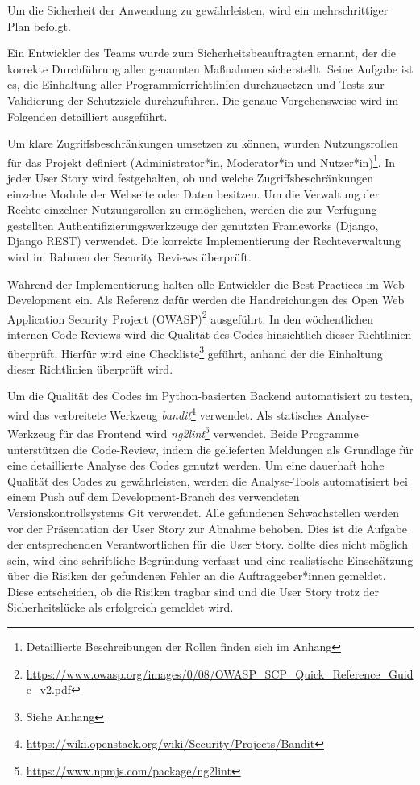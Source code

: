 \documentclass[accentcolor=tud0b,12pt,paper=a4]{tudreport}
\begin{document}
Um die Sicherheit der Anwendung zu gewährleisten, wird ein mehrschrittiger Plan befolgt.

Ein Entwickler des Teams wurde zum Sicherheitsbeauftragten ernannt, der die korrekte Durchführung aller genannten Maßnahmen sicherstellt. Seine Aufgabe ist es, die Einhaltung aller Programmierrichtlinien durchzusetzen und Tests zur Validierung der Schutzziele durchzuführen. Die genaue Vorgehensweise wird im Folgenden detailliert ausgeführt.

Um klare Zugriffsbeschränkungen umsetzen zu können, wurden Nutzungsrollen für das Projekt definiert (Administrator*in, Moderator*in und Nutzer*in)\footnote{Detaillierte Beschreibungen der Rollen finden sich im Anhang}. In jeder User Story wird festgehalten, ob und welche Zugriffsbeschränkungen einzelne Module der Webseite oder Daten besitzen. Um die Verwaltung der Rechte einzelner Nutzungsrollen zu ermöglichen, werden die zur Verfügung gestellten Authentifizierungswerkzeuge der genutzten Frameworks (Django, Django REST) verwendet. Die korrekte Implementierung der Rechteverwaltung wird im Rahmen der Security Reviews überprüft.

Während der Implementierung halten alle Entwickler die Best Practices im Web Development ein. Als Referenz dafür werden die Handreichungen des Open Web Application Security Project (OWASP)\footnote{\href{https://www.owasp.org/images/0/08/OWASP_SCP_Quick_Reference_Guide_v2.pdf}{https://www.owasp.org/images/0/08/OWASP\_SCP\_Quick\_Reference\_Guide\_v2.pdf}} ausgeführt. In den wöchentlichen internen Code-Reviews wird die Qualität des Codes hinsichtlich dieser Richtlinien überprüft. Hierfür wird eine Checkliste\footnote{Siehe Anhang} geführt, anhand der die Einhaltung dieser Richtlinien überprüft wird.

Um die Qualität des Codes im Python-basierten Backend automatisiert zu testen, wird das verbreitete Werkzeug \emph{bandit}\footnote{\href{https://wiki.openstack.org/wiki/Security/Projects/Bandit}{https://wiki.openstack.org/wiki/Security/Projects/Bandit}} verwendet. Als statisches Analyse-Werkzeug für das Frontend wird \emph{ng2lint}\footnote{\href{https://www.npmjs.com/package/ng2lint}{https://www.npmjs.com/package/ng2lint}} verwendet. Beide Programme unterstützen die Code-Review, indem die gelieferten Meldungen als Grundlage für eine detaillierte Analyse des Codes genutzt werden.  Um eine dauerhaft hohe Qualität des Codes zu gewährleisten, werden die Analyse-Tools automatisiert bei einem Push auf dem Development-Branch des verwendeten Versionskontrollsystems Git verwendet. Alle gefundenen Schwachstellen werden vor der Präsentation der User Story zur Abnahme behoben. Dies ist die Aufgabe der entsprechenden Verantwortlichen für die User Story. Sollte dies nicht möglich sein, wird eine schriftliche Begründung verfasst und eine realistische Einschätzung über die Risiken der gefundenen Fehler an die Auftraggeber*innen gemeldet. Diese entscheiden, ob die Risiken tragbar sind und die User Story trotz der Sicherheitslücke als erfolgreich gemeldet wird.
\end{document}
